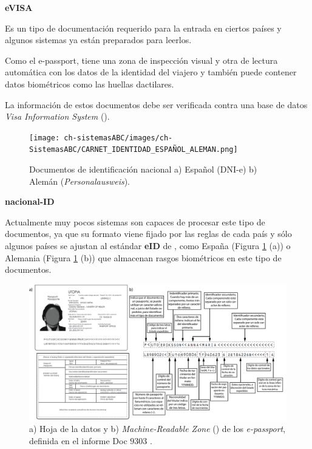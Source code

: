 \medskip
\textbf{\gls{eVISA}}

Es un tipo de documentación requerido para la entrada en ciertos países y algunos sistemas  ya están preparados para leerlos. 

Como el \gls{e-passport}, tiene una zona de inspección visual \textbf{} y otra de lectura automática \textbf{} con los datos de la identidad del viajero y también puede contener datos biométricos como las huellas dactilares. 

La información de estos documentos debe ser verificada contra una base de datos \textit{Visa Information System} (\textbf{}). 

\begin{figure}[ht]
    \centering
    \texttt{[image: ch-sistemasABC/images/ch-SistemasABC/CARNET\_IDENTIDAD\_ESPAÑOL\_ALEMAN.png]}
    \caption{Documentos de identificación nacional a) Español (\gls{DNI-e}) b) Alemán (\textit{\gls{Personalausweis}}).}
    \label{fig:DocIdentidadNacional}
\end{figure}

\medskip
\textbf{\Gls{nacional-ID}}

Actualmente muy pocos sistemas  son capaces de procesar este tipo de documentos, ya que su formato viene fijado por las reglas de cada país y sólo algunos países se ajustan al estándar \textbf{\gls{eID}} de  \cite{doc20069303}, como España (Figura \ref{fig:DocIdentidadNacional} (a)) o Alemania (Figura \ref{fig:DocIdentidadNacional} (b)) que almacenan rasgos biométricos en este tipo de documentos. 

\begin{landscape}
 \begin{figure}
  \centering
  \includegraphics[scale=0.6]{ch-sistemasABC/images/ch-SistemasABC/HOJA_DE_DATOS_Y_MRZ_DEL_PASAPORTE.png}
  \caption{a) Hoja de la datos y b) \textit{Machine-Readable Zone} () de los \textit{\gls{e-passport}}, definida en el informe  Doc $9303$ \cite{doc20069303}.}
  \label{fig:HojaDatos_MRZ}
\end{figure}
\end{landscape}



